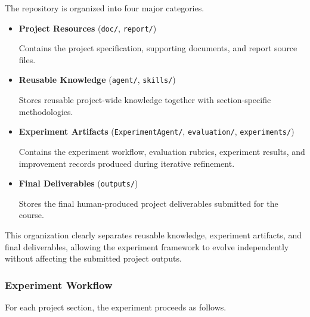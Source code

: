 The repository is organized into four major categories.

\begin{itemize}

    \item \textbf{Project Resources} (\texttt{doc/}, \texttt{report/})

    Contains the project specification, supporting documents, and report source files.

    \item \textbf{Reusable Knowledge} (\texttt{agent/}, \texttt{skills/})

    Stores reusable project-wide knowledge together with section-specific methodologies.

    \item \textbf{Experiment Artifacts} (\texttt{ExperimentAgent/}, \texttt{evaluation/}, \texttt{experiments/})

    Contains the experiment workflow, evaluation rubrics, experiment results, and improvement records produced during iterative refinement.

    \item \textbf{Final Deliverables} (\texttt{outputs/})

    Stores the final human-produced project deliverables submitted for the course.

\end{itemize}

This organization clearly separates reusable knowledge, experiment artifacts, and final deliverables, allowing the experiment framework to evolve independently without affecting the submitted project outputs.


\subsubsection{Experiment Workflow}

For each project section, the experiment proceeds as follows.

